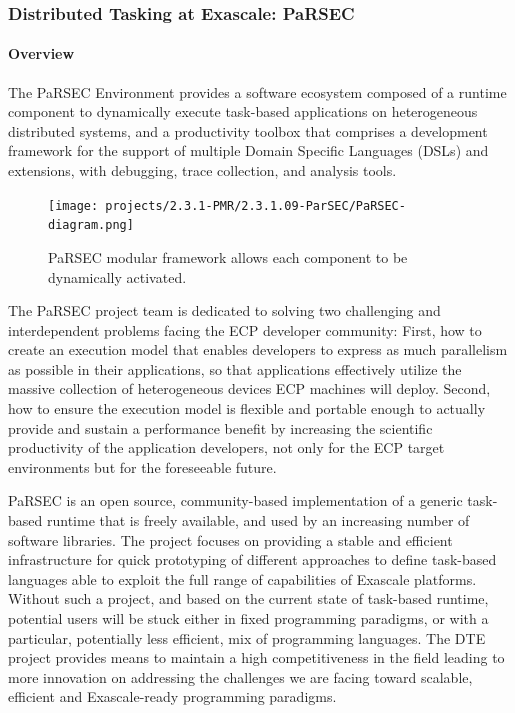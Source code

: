 \subsubsection{ Distributed Tasking at Exascale: PaRSEC}


\paragraph{Overview}

The PaRSEC Environment provides a software ecosystem composed of a runtime
component to dynamically execute task-based applications on heterogeneous
distributed systems, and a productivity toolbox that comprises a development
framework for the support of multiple Domain Specific Languages (DSLs) and
extensions, with debugging, trace collection, and analysis tools.
%
\begin{figure}
\texttt{[image: projects/2.3.1-PMR/2.3.1.09-ParSEC/PaRSEC-diagram.png]}
\caption{PaRSEC\label{fig:parsec} modular framework allows each
component to be dynamically activated.}
\end{figure}
%
The PaRSEC project team is dedicated to solving two challenging and
interdependent problems facing the ECP developer community: First, how to create
an execution model that enables developers to express as much parallelism as
possible in their applications, so that applications effectively utilize the
massive collection of heterogeneous devices ECP machines will deploy. Second,
how to ensure the execution model is flexible and portable enough to actually
provide and sustain a performance benefit by increasing the scientific
productivity of the application developers, not only for the ECP target
environments but for the foreseeable future.

PaRSEC is an open source, community-based implementation of a generic task-based
runtime that is freely available, and used by an increasing number of software
libraries.
The project focuses on providing a stable and efficient infrastructure for quick
prototyping of different approaches to define task-based languages able to
exploit the full range of capabilities of Exascale platforms. Without such a
project, and based on the current state of task-based runtime, potential users
will be stuck either in fixed programming paradigms, or with a particular,
potentially less efficient, mix of programming languages. The DTE project
provides means to maintain a high competitiveness in the field leading to more
innovation on addressing the challenges we are facing toward scalable,
efficient and Exascale-ready programming paradigms.

